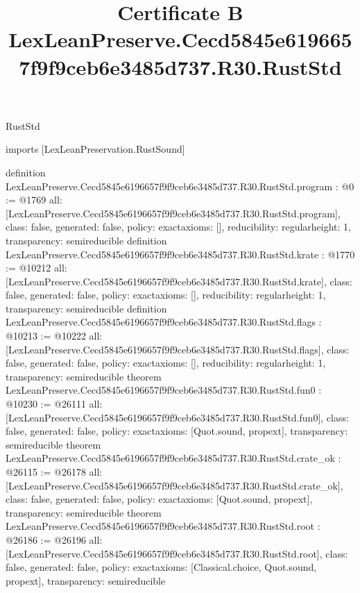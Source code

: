 \begin{lexlean}{RustStd}
\title{Certificate B LexLeanPreserve.Cecd5845e6196657f9f9ceb6e3485d737.R30.RustStd}
\begin{coremodule}
imports [LexLeanPreservation.RustSound]

definition LexLeanPreserve.Cecd5845e6196657f9f9ceb6e3485d737.R30.RustStd.program : @0 := @1769 {
  all: [LexLeanPreserve.Cecd5845e6196657f9f9ceb6e3485d737.R30.RustStd.program],
  class: false,
  generated: false,
  policy: exact{axioms: []},
  reducibility: regular{height: 1},
  transparency: semireducible
}
definition LexLeanPreserve.Cecd5845e6196657f9f9ceb6e3485d737.R30.RustStd.krate : @1770 := @10212 {
  all: [LexLeanPreserve.Cecd5845e6196657f9f9ceb6e3485d737.R30.RustStd.krate],
  class: false,
  generated: false,
  policy: exact{axioms: []},
  reducibility: regular{height: 1},
  transparency: semireducible
}
definition LexLeanPreserve.Cecd5845e6196657f9f9ceb6e3485d737.R30.RustStd.flags : @10213 := @10222 {
  all: [LexLeanPreserve.Cecd5845e6196657f9f9ceb6e3485d737.R30.RustStd.flags],
  class: false,
  generated: false,
  policy: exact{axioms: []},
  reducibility: regular{height: 1},
  transparency: semireducible
}
theorem LexLeanPreserve.Cecd5845e6196657f9f9ceb6e3485d737.R30.RustStd.fun0 : @10230 := @26111 {
  all: [LexLeanPreserve.Cecd5845e6196657f9f9ceb6e3485d737.R30.RustStd.fun0],
  class: false,
  generated: false,
  policy: exact{axioms: [Quot.sound, propext]},
  transparency: semireducible
}
theorem LexLeanPreserve.Cecd5845e6196657f9f9ceb6e3485d737.R30.RustStd.crate_ok : @26115 := @26178 {
  all: [LexLeanPreserve.Cecd5845e6196657f9f9ceb6e3485d737.R30.RustStd.crate_ok],
  class: false,
  generated: false,
  policy: exact{axioms: [Quot.sound, propext]},
  transparency: semireducible
}
theorem LexLeanPreserve.Cecd5845e6196657f9f9ceb6e3485d737.R30.RustStd.root : @26186 := @26196 {
  all: [LexLeanPreserve.Cecd5845e6196657f9f9ceb6e3485d737.R30.RustStd.root],
  class: false,
  generated: false,
  policy: exact{axioms: [Classical.choice, Quot.sound, propext]},
  transparency: semireducible
}


\end{coremodule}
\end{lexlean}
